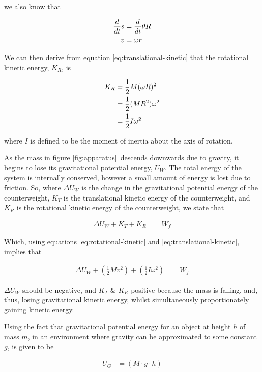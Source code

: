 \documentclass[coverpage]{article}
\begin{document}
	we also know that
	
	\begin{align}
		\frac{d}{dt}s&=\frac{d}{dt}\theta R \notag \\
		v&=\omega r \label{eq:omega-v-relationship}
	\end{align}

	We can then derive from equation \ref{eq:translational-kinetic} that the rotational kinetic energy, $K_R$, is
	
	\begin{align}
		K_R&=\frac{1}{2}M(\omega R)^2 \notag \\
		&=\frac{1}{2} (M R^2) \omega^2 \notag \\
		&=\frac{1}{2} I \omega^2 \label{eq:rotational-kinetic}
	\end{align}

	where $I$ is defined to be the moment of inertia about the axis of rotation.
	
	As the mass in figure \ref{fig:apparatus}~descends downwards due to gravity, it begins to lose its gravitational potential energy, $U_W$. The total energy of the system is internally conserved, however a small amount of energy is lost due to friction. So, where $\Delta{U}_W$ is the change in the gravitational potential energy of the counterweight, $K_T$ is the translational kinetic energy of the counterweight, and $K_R$ is the rotational kinetic energy of the counterweight, we state that
	
	\begin{align}
		\Delta{U}_W + K_T + K_R&=W_f
	\end{align}

	Which, using equations \ref{eq:rotational-kinetic} and \ref{eq:translational-kinetic}, implies that
	
	\begin{align}
		\Delta{U}_W + (\frac{1}{2} M v^2) + (\frac{1}{2} I \omega^2)&=W_f
	\end{align}

	$\Delta{U}_W$ should be negative, and $K_T$ \& $K_R$ positive because the mass is falling, and, thus, losing gravitational kinetic energy, whilst simultaneously proportionately gaining kinetic energy.
	
	Using the fact that gravitational potential energy for an object at height $h$ of mass $m$, in an environment where gravity can be approximated to some constant $g$, is given to be
	
	\begin{align}
		U_G&=(M \cdot g \cdot h)
	\end{align}
	
\end{document}
